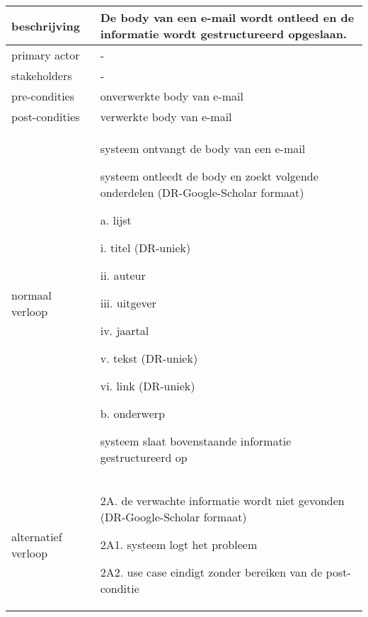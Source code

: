 \begin{table}[ptb]
    \centering
    \begin{tabular}{ | m{5cm} | m{10cm}| } 
        \hline
        \rowcolor{lightgray}
        beschrijving & De body van een e-mail wordt ontleed en de informatie wordt gestructureerd opgeslaan. \\ 
        \hline
        primary actor & - \\ 
        \hline
        stakeholders & - \\ 
        \hline
        pre-condities & onverwerkte body van e-mail \\ 
        \hline
        post-condities & verwerkte body van e-mail \\ 
        \hline
        normaal verloop & 
        \begin{enumerate}
            \item systeem ontvangt de body van een e-mail
            \item systeem ontleedt de body en zoekt volgende onderdelen (DR-Google-Scholar formaat)
            \begin{description}
                \item a. lijst
                \begin{description}
                    \item i. titel (DR-uniek)
                    \item ii. auteur
                    \item iii. uitgever
                    \item iv. jaartal
                    \item v. tekst (DR-uniek)
                    \item vi. link (DR-uniek)
                \end{description}
                \item b. onderwerp
            \end{description}
            \item systeem slaat bovenstaande informatie gestructureerd op
        \end{enumerate} \\ 
        \hline
        alternatief verloop & 
        \begin{description}
            \item 2A. de verwachte informatie wordt niet gevonden (DR-Google-Scholar formaat)
            \item 2A1. systeem logt het probleem
            \item 2A2. use case eindigt zonder bereiken van de post-conditie

\end{description}
\end{tabular}
\end{table}
